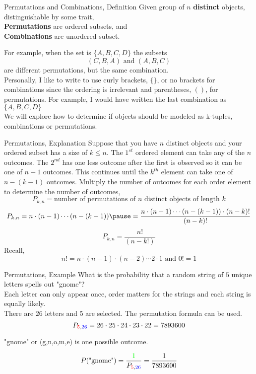 \documentclass[]{beamer}
\newcommand{\blue}[1]{{\color{blue} #1}}
\newcommand{\red}[1]{{\color{red} #1}}
\newcommand{\grn}[1]{{\color{green} #1}}
\newcommand{\nl}[1]{\vspace{#1 em}}
\begin{document}
\begin{frame}{Permutations and Combinations, Definition}
    Given group of $n$ {\bf distinct} objects, distinguishable by some trait, \\
    \nl{0.5}
    {\bf Permutations} are ordered subsets,
    and\\
    \nl{0.5}
    {\bf Combinations} are unordered subset.

    For example, when the set is $\{ A, B, C, D\}$ the subsets
    \[(C, B, A) \text{ and } (A, B, C)\]
    are different permutations, but the same combination.\\
    \nl{0.5}
    \pause Personally, I like to write to use curly brackets, $\{\}$, or no brackets for combinations since the ordering is irrelevant and parentheses, $()$, for permutations. For example, I would have written the last combination as $\{A,B,C,D\}$\\ 
    \nl{0.5}
    We will explore how to determine if objects should be modeled as k-tuples, combinations or permutations.
\end{frame}

\begin{frame}{Permutations, Explanation}
    Suppose that you have $n$ distinct objects and your ordered subset has a size of $k\leq n$. The $1^{st}$ ordered element can take any of the $n$ outcomes. The $2^{nd}$ has one less outcome after the first is observed so it can be one of $n-1$ outcomes. This continues until the $k^{th}$ element can take one of $n-(k-1)$ outcomes. \pause Multiply the number of outcomes for each order element to determine the number of outcomes, 
    \[P_{k,n} = \text{number of permutations of } n \text{ distinct objects of length } k \]
    \[P_{k,n} = n\cdot (n-1) \cdots  (n-(k-1)) \pause = \frac{n\cdot (n-1) \cdots  (n-(k-1)) \cdot(n-k)!}{(n-k)!}\]
    \[ P_{k,n} =\frac{n!}{(n-k!)}\]
    Recall,
    \[n! = n\cdot(n-1)\cdot(n-2) \cdots 2 \cdot 1 \text{ and } 0! =1\]
\end{frame}

\begin{frame}{Permutations, Example}
    What is the probability that a random string of $5$ unique letters spells out "gnome"?
    \\
    \pause \nl{0.5} Each letter can only appear once, order matters for the strings and each string is equally likely.
    \\
    \nl{0.5}
    There are \blue{$26$ letters} and \red{$5$ are selected}. The permutation formula can be used.
    \[P_{\red{5},\blue{26}} = 26 \cdot 25 \cdot 24 \cdot 23 \cdot 22 = 7893600\]

    \pause "gnome" or (g,n,o,m,e) is \grn{one} possible outcome.

    \[P(\text{"gnome"}) = \frac{\grn{1}}{P_{\red{5},\blue{26}}} = \frac{1}{7893600}\]
    
\end{frame}
\end{document}
